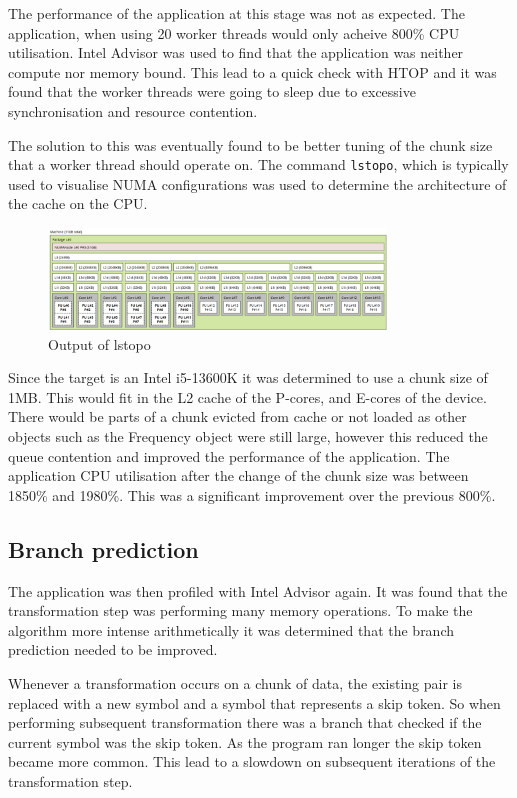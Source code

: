 \documentclass{article}
\begin{document}
The performance of the application at this stage was not as expected. The application, when using 20 worker 
threads would only acheive 800\% CPU utilisation. Intel Advisor was used to find that the application was neither
compute nor memory bound. This lead to a quick check with HTOP and it was found that the worker threads 
were going to sleep due to excessive synchronisation and resource contention.

The solution to this was eventually found to be better tuning of the chunk size that a worker thread should 
operate on. The command \texttt{lstopo}, which is typically used to visualise NUMA configurations was
used to determine the architecture of the cache on the CPU. 

\begin{figure}[H]
    \centering
    \includegraphics[width=0.8\textwidth]{lstopo.png}
    \caption{Output of lstopo}
\end{figure}

Since the target is an Intel i5-13600K it was determined to use a chunk size of 1MB. This would fit in the L2
cache of the P-cores, and E-cores of the device. There would be parts of a chunk evicted from cache or not loaded 
as other objects such as the Frequency object were still large, however this reduced the queue contention and
improved the performance of the application. The application CPU utilisation after the change of the chunk size
was between 1850\% and 1980\%. This was a significant improvement over the previous 800\%.

\subsection{Branch prediction}

The application was then profiled with Intel Advisor again. It was found that the transformation step was 
performing many memory operations. To make the algorithm more intense arithmetically it was determined that
the branch prediction needed to be improved.

Whenever a transformation occurs on a chunk of data, the existing pair is replaced with a new symbol and a 
symbol that represents a skip token. So when performing subsequent transformation there was a branch that 
checked if the current symbol was the skip token. As the program ran longer the skip token became more common.
This lead to a slowdown on subsequent iterations of the transformation step. 
\end{document}
